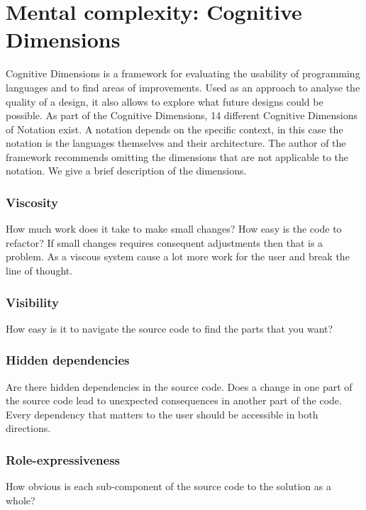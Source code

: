 \documentclass[12pt]{report}
\theoremstyle{definition}
\theoremstyle{theorem}
\begin{document}
\section{Mental complexity: Cognitive Dimensions}\label{cognitivedimensions}

Cognitive Dimensions is a framework for evaluating the usability of programming
languages and to find areas of improvements. Used as an approach to analyse the
quality of a design, it also allows to explore what future designs could be
possible. As part of the Cognitive Dimensions, 14 different Cognitive Dimensions
of Notation exist. A notation depends on the specific context, in this case the
notation is the languages themselves and their architecture. The author of the
framework recommends omitting the dimensions that are not applicable to the
notation. We give a brief description of the dimensions.

\subsubsection*{Viscosity}

How much work does it take to make small changes? How easy is the code to
refactor? If small changes requires consequent adjustments then that is a
problem. As a viscous system cause a lot more work for the user and break the
line of thought.

\subsubsection*{Visibility}

How easy is it to navigate the source code to find the parts that you want?

\subsubsection*{Hidden dependencies}

Are there hidden dependencies in the source code. Does a change in one part of
the source code lead to unexpected consequences in another part of the code.
Every dependency that matters to the user should be accessible in both
directions. 

\subsubsection*{Role-expressiveness}

How obvious is each sub-component of the source code to the solution as a whole?
\end{document}
